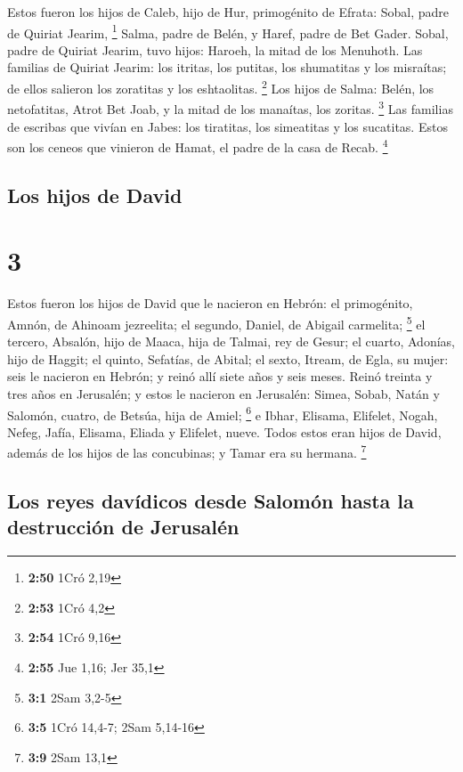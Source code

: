  Estos fueron los hijos de Caleb, hijo de Hur,
primogénito de Efrata: Sobal, padre de Quiriat Jearim, \footnote{\textbf{2:50}
  1Cró 2,19}  Salma, padre de Belén, y Haref, padre de
Bet Gader.  Sobal, padre de Quiriat Jearim, tuvo hijos:
Haroeh, la mitad de los Menuhoth.  Las familias de
Quiriat Jearim: los itritas, los putitas, los shumatitas y los
misraítas; de ellos salieron los zoratitas y los eshtaolitas.
\footnote{\textbf{2:53} 1Cró 4,2}  Los hijos de Salma:
Belén, los netofatitas, Atrot Bet Joab, y la mitad de los manaítas, los
zoritas. \footnote{\textbf{2:54} 1Cró 9,16}  Las familias
de escribas que vivían en Jabes: los tiratitas, los simeatitas y los
sucatitas. Estos son los ceneos que vinieron de Hamat, el padre de la
casa de Recab. \footnote{\textbf{2:55} Jue 1,16; Jer 35,1}

\hypertarget{los-hijos-de-david}{%
\subsection{Los hijos de David}\label{los-hijos-de-david}}

\hypertarget{section-2}{%
\section{3}\label{section-2}}

 Estos fueron los hijos de David que le nacieron en
Hebrón: el primogénito, Amnón, de Ahinoam jezreelita; el segundo,
Daniel, de Abigail carmelita; \footnote{\textbf{3:1} 2Sam 3,2-5}
 el tercero, Absalón, hijo de Maaca, hija de Talmai, rey
de Gesur; el cuarto, Adonías, hijo de Haggit;  el quinto,
Sefatías, de Abital; el sexto, Itream, de Egla, su mujer: 
seis le nacieron en Hebrón; y reinó allí siete años y seis meses. Reinó
treinta y tres años en Jerusalén;  y estos le nacieron en
Jerusalén: Simea, Sobab, Natán y Salomón, cuatro, de Betsúa, hija de
Amiel; \footnote{\textbf{3:5} 1Cró 14,4-7; 2Sam 5,14-16} 
e Ibhar, Elisama, Elifelet,  Nogah, Nefeg, Jafía,
 Elisama, Eliada y Elifelet, nueve.  Todos
estos eran hijos de David, además de los hijos de las concubinas; y
Tamar era su hermana. \footnote{\textbf{3:9} 2Sam 13,1}

\hypertarget{los-reyes-davuxeddicos-desde-salomuxf3n-hasta-la-destrucciuxf3n-de-jerusaluxe9n}{%
\subsection{Los reyes davídicos desde Salomón hasta la destrucción de
Jerusalén}\label{los-reyes-davuxeddicos-desde-salomuxf3n-hasta-la-destrucciuxf3n-de-jerusaluxe9n}}

